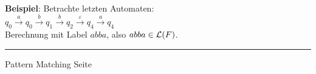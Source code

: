 \begin{slide}{}
\textbf{Beispiel}: Betrachte letzten Automaten: \\[0.3cm]
\hspace*{1.3cm} $q_0 \stackrel{a}{\rightarrow} q_0 \stackrel{b}{\rightarrow} q_1 \stackrel{b}{\rightarrow} q_2 \stackrel{\varepsilon}{\rightarrow} q_4 \stackrel{a}{\rightarrow}
q_4$ \\[0.3cm]
Berechnung mit Label $abba$, also $abba \in {\cal L}(F)$.



\vspace*{\fill}
\tiny \addtocounter{mypage}{1}
\rule{17cm}{1mm}
Pattern Matching \hspace*{\fill} Seite 
\end{slide}


